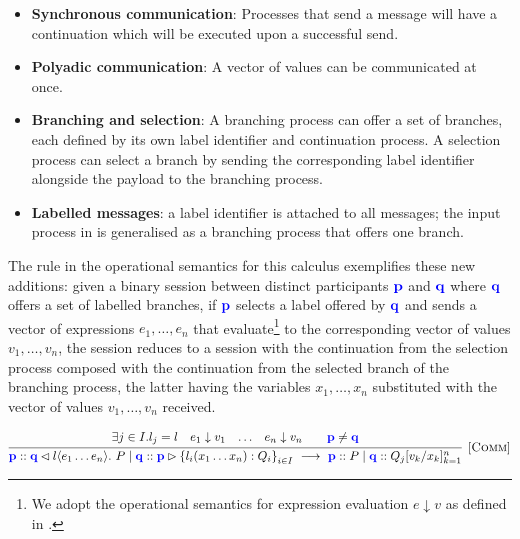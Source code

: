 \begin{itemize}
\item \textbf{Synchronous communication}: Processes that send a message will have a continuation which will be executed upon a successful send. 
\item \textbf{Polyadic communication}: A vector of values can be communicated at once.
\item \textbf{Branching and selection}: A branching process can offer a set of branches, each defined by its own label identifier and continuation process. A selection process can select a branch by sending the corresponding label identifier alongside the payload to the branching process.

\item \textbf{Labelled messages}: a label identifier is attached to all messages; the input process in \mathref{\ref{section_async}} is generalised as a branching process that offers one branch.
\end{itemize}

The  rule in the operational semantics for this calculus exemplifies these new additions: given a binary session between distinct participants ${\color{blue}\mathbf{p}}$ and ${\color{blue}\mathbf{q}}$ where ${\color{blue}\mathbf{q}}$ offers a set of labelled branches, if ${\color{blue}\mathbf{p}}$ selects a label offered by ${\color{blue}\mathbf{q}}$ and sends a vector of expressions $e_1, \dots, e_n$ that evaluate\footnote{We adopt the operational semantics for expression evaluation $e \downarrow v$ as defined in \cite{C406Lecture}.} to the corresponding vector of values $v_1, \dots, v_n$, the session reduces to a session with the continuation from the selection process composed with the continuation from the selected branch of the branching process, the latter having the variables $x_1, \dots, x_n$ substituted with the vector of values $v_1, \dots, v_n$ received.

$$
\infer[\mbox{\rulename{Comm}}]{
	\parti{p} :: \sel{\parti{q}}{l}{e_1 \dots e_n}.~P \mid 
	\parti{q} :: \bra{\parti{p}}{l_i(x_1 \dots x_n):Q_i}_{i\in I} ~\longrightarrow~ \parti{p} :: P \mid \parti{q} ::Q_j[v_k/x_k]^n_{k=1}
}{
	\begin{array}{cccccc}
	\exists	j \in I. l_j = l
	&
	e_1 \downarrow v_1 
	& \dots 
	& e_n \downarrow v_n
	&
	& \parti{p} \neq \parti{q}
	\end{array}
}
$$

